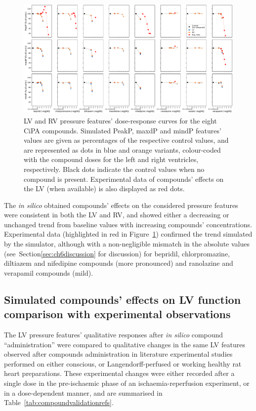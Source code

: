\begin{figure}[ht!]
    \myfloatalign
    \includegraphics[width=\textwidth]{figures/chapter06/simulated_cipa_compounds_effects_on_lv_rv_pressure_features_with_expdata.pdf}
    \caption{LV and RV pressure features' dose-response curves for the eight CiPA compounds. Simulated PeakP, maxdP and mindP features' values are given as percentages of the respective control values, and are represented as dots in blue and orange variants, colour-coded with the compound doses for the left and right ventricles, respectively. Black dots indicate the control values when no compound is present. Experimental data of compounds' effects on the LV (when available) is also displayed as red dots.}
    \label{fig:LVRVfeatsalldrugsrespcurves}
\end{figure}

\vspace{0.2cm}
The \textit{in silico} obtained compounds' effects on the considered pressure features were consistent in both the LV and RV, and showed either a decreasing or unchanged trend from baseline values with increasing compounds' concentrations. Experimental data (highlighted in red in Figure~\ref{fig:LVRVfeatsalldrugsrespcurves}) confirmed the trend simulated by the simulator, although with a non-negligible mismatch in the absolute values (see~Section\ref{sec:ch6discussion} for discussion) for bepridil, chlorpromazine, diltiazem and nifedipine compounds (more pronounced) and ranolazine and verapamil compounds (mild).


%
%
%
\subsection{Simulated compounds' effects on LV function comparison with experimental observations}\label{sec:ch6model_simulated_compounds'_effects_on_whole-organ_function_comparison_with_experimental_observations}
The LV pressure features' qualitative responses after \textit{in silico} compound ``administration'' were compared to qualitative changes in the same LV features observed after compounds administration in literature experimental studies performed on either conscious, or Langendorff-perfused or working healthy rat heart preparations. These experimental changes were either recorded after a single dose in the pre-ischaemic phase of an ischaemia-reperfusion experiment, or in a dose-dependent manner, and are summarised in Table~\ref{tab:compoundvalidationrefs}.

